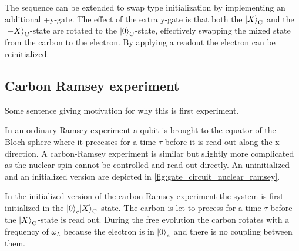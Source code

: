 The sequence can be extended to swap type initialization by implementing an additional $\mp{\mathrm{y}}$-gate.
The effect of the extra y-gate is that both the  ${\left\vert{X}\right\rangle}_\mathrm{C} $ and the  ${\left\vert{-X}\right\rangle}_\mathrm{C} $-state are rotated to the  ${\left\vert{0}\right\rangle}_\mathrm{C} $-state, effectively swapping the mixed state from the carbon to the electron.
By applying a readout the electron can be reinitialized.


\subsection{Carbon Ramsey experiment }
Some sentence giving motivation for why this is first experiment.

In an ordinary Ramsey experiment a qubit is brought to the equator of the Bloch-sphere where it precesses for a time $\tau $ before it is read out along the x-direction.
A carbon-Ramsey experiment is similar but slightly more complicated as the nuclear spin cannot be controlled and read-out directly.
An uninitialized and an initialized version are depicted in \cref{fig:gate_circuit_nuclear_ramsey}.

In the initialized version of the carbon-Ramsey experiment the system is first initialized in the ${\left\vert{0}\right\rangle}_e{\left\vert{X}\right\rangle}_\mathrm{C}$-state.
The carbon is let to precess for a time $\tau$ before the ${\left\vert{X}\right\rangle}_\mathrm{C}$-state is read out.
During the free evolution the carbon rotates with a frequency of $\omega_L$ because the electron is in ${\left\vert{0}\right\rangle}_e$ and there is no coupling between them.

